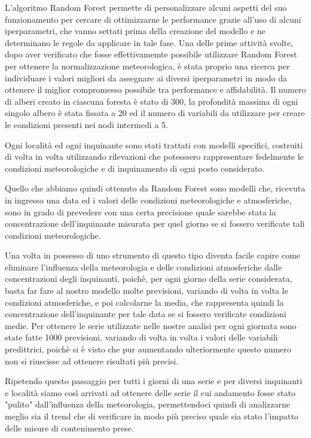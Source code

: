 \documentclass[a4paper]{report}
\begin{document}
L'algoritmo Random Forest permette di personalizzare alcuni aspetti del suo funzionamento per cercare di ottimizzarne le performance grazie all'uso di alcuni iperparametri, che vanno settati prima della creazione del modello e ne determinano le regole da applicare in tale fase. Una delle prime attività svolte, dopo aver verificato che fosse effettivamemte possibile utilizzare Random Forest per ottenere la normalizzazione meteorologica, è stata proprio una ricerca per individuare i valori migliori da assegnare ai diversi iperparametri in modo da ottenere il miglior compromesso possibile tra performance e affidabilità. Il numero di alberi creato in ciascuna foresta è stato di 300, la profondità massima di ogni singolo albero è stata fissata a 20 ed il numero di variabili da utilizzare per creare le condizioni presenti nei nodi intermedi a 5.

Ogni località ed ogni inquinante sono stati trattati con modelli specifici, costruiti di volta in volta utilizzando rilevazioni che potesssero rappresentare fedelmente le condizioni meteorologiche e di inquinamento di ogni posto considerato.  

Quello che abbiamo quindi ottenuto da Random Forest sono modelli che, ricevuta in ingresso una data ed i valori delle condizioni meteorologiche e atmosferiche, sono in grado di prevedere con una certa precisione quale sarebbe stata la concentrazione dell'inquinante misurata per quel giorno se si fossero verificate tali condizioni meteorologiche.  

Una volta in possesso di uno strumento di questo tipo diventa facile capire come eliminare l'influenza della meteorologia e delle condizioni atmosferiche dalle concentrazioni degli inquinanti, poichè, per ogni giorno della serie considerata, basta far fare al nostro modello molte previsioni, variando di volta in volta le condizioni atmosferiche, e poi calcolarne la media, che rappresenta quindi la concentrazione dell'inquinante per tale data se si fossero verificate condizioni medie. Per ottenere le serie utilizzate nelle nostre analisi per ogni giornata sono state fatte 1000 previsioni, variando di volta in volta i valori delle variabili predittrici, poichè si è visto che pur aumentando ulteriormente questo numero non si riuscisse ad ottenere risultati più precisi.

Ripetendo questo passaggio per tutti i giorni di una serie e per diversi inquinanti e località siamo così arrivati ad ottenere delle serie il cui andamento fosse stato "pulito" dall'influenza della meteorologia, permettendoci quindi di analizzarne meglio sia il trend che di verificare in modo più preciso quale sia stato l'impatto delle misure di contenimento prese.  
\end{document}
